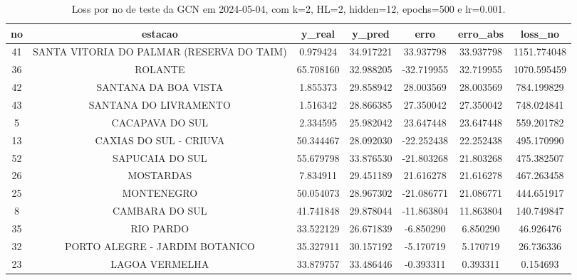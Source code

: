 \begin{table}[h]
\centering
\caption{Loss por no de teste da GCN em 2024-05-04, com k=2, HL=2, hidden=12, epochs=500 e lr=0.001.}
\label{tab:gcn_loss_k2_hl2_h12_e500_d20240504}
\begin{tabular}{ccccccc}
\toprule
no & estacao & y\_real & y\_pred & erro & erro\_abs & loss\_no \\
\midrule
41 & SANTA VITORIA DO PALMAR (RESERVA DO TAIM) & 0.979424 & 34.917221 & 33.937798 & 33.937798 & 1151.774048 \\
36 & ROLANTE & 65.708160 & 32.988205 & -32.719955 & 32.719955 & 1070.595459 \\
42 & SANTANA DA BOA VISTA & 1.855373 & 29.858942 & 28.003569 & 28.003569 & 784.199829 \\
43 & SANTANA DO LIVRAMENTO & 1.516342 & 28.866385 & 27.350042 & 27.350042 & 748.024841 \\
5 & CACAPAVA DO SUL & 2.334595 & 25.982042 & 23.647448 & 23.647448 & 559.201782 \\
13 & CAXIAS DO SUL - CRIUVA & 50.344467 & 28.092030 & -22.252438 & 22.252438 & 495.170990 \\
52 & SAPUCAIA DO SUL & 55.679798 & 33.876530 & -21.803268 & 21.803268 & 475.382507 \\
26 & MOSTARDAS & 7.834911 & 29.451189 & 21.616278 & 21.616278 & 467.263458 \\
25 & MONTENEGRO & 50.054073 & 28.967302 & -21.086771 & 21.086771 & 444.651917 \\
8 & CAMBARA DO SUL & 41.741848 & 29.878044 & -11.863804 & 11.863804 & 140.749847 \\
35 & RIO PARDO & 33.522129 & 26.671839 & -6.850290 & 6.850290 & 46.926476 \\
32 & PORTO ALEGRE - JARDIM BOTANICO & 35.327911 & 30.157192 & -5.170719 & 5.170719 & 26.736336 \\
23 & LAGOA VERMELHA & 33.879757 & 33.486446 & -0.393311 & 0.393311 & 0.154693 \\
\bottomrule
\end{tabular}
\end{table}
